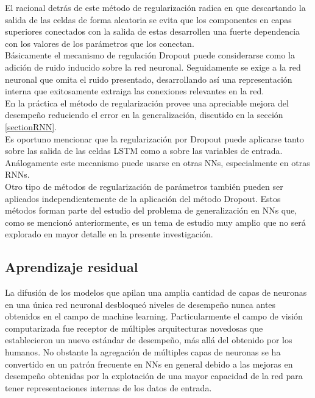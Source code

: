 \documentclass{article}
\begin{document}
	El racional detrás de este método de regularización radica en que descartando la salida de las celdas de forma aleatoria se evita que los componentes en capas superiores conectados con la salida de estas desarrollen una fuerte dependencia con los valores de los parámetros que los conectan.\\
	Básicamente el mecanismo de regulación Dropout puede considerarse como la adición de ruido inducido sobre la red neuronal. Seguidamente se exige a la red neuronal que omita el ruido presentado, desarrollando así una representación interna que exitosamente extraiga las conexiones relevantes en la red.\\
	
	En la práctica el método de regularización provee una apreciable mejora del desempeño reduciendo el error en la generalización, discutido en la sección \ref{sectionRNN}.\\
	Es oportuno mencionar que la regularización por Dropout puede aplicarse tanto sobre las salida de las celdas LSTM como a sobre las variables de entrada. Análogamente este mecanismo puede usarse en otras NNs, especialmente en otras RNNs.\\
	
	Otro tipo de métodos de regularización de parámetros también pueden ser aplicados independientemente de la aplicación del método Dropout. Estos métodos forman parte del estudio del problema de generalización en NNs que, como se mencionó anteriormente, es un tema de estudio muy amplio que no será explorado en mayor detalle en la presente investigación.
	
	\subsection{Aprendizaje residual}
	La difusión de los modelos que apilan una amplia cantidad de capas de neuronas en una única red neuronal desbloqueó niveles de desempeño nunca antes obtenidos en el campo de machine learning. Particularmente el campo de visión computarizada fue receptor de múltiples arquitecturas novedosas que establecieron un nuevo estándar de desempeño, más allá del obtenido por los humanos\cite{27DNNAgainstHumans}. No obstante la agregación de múltiples capas de neuronas se ha convertido en un patrón frecuente en NNs en general debido a las mejoras en desempeño obtenidas por la explotación de una mayor capacidad de la red para tener representaciones internas de los datos de entrada.\\
	
\end{document}
